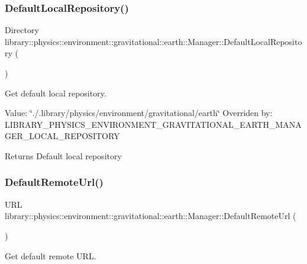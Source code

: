 \subsubsection{\texorpdfstring{Default\+Local\+Repository()}{DefaultLocalRepository()}}
{\footnotesize\ttfamily Directory library\+::physics\+::environment\+::gravitational\+::earth\+::\+Manager\+::\+Default\+Local\+Repository (\begin{DoxyParamCaption}{ }\end{DoxyParamCaption})\hspace{0.3cm}{\ttfamily [static]}}



Get default local repository. 

Value\+: \char`\"{}./.\+library/physics/environment/gravitational/earth\char`\"{} Overriden by\+: L\+I\+B\+R\+A\+R\+Y\+\_\+\+P\+H\+Y\+S\+I\+C\+S\+\_\+\+E\+N\+V\+I\+R\+O\+N\+M\+E\+N\+T\+\_\+\+G\+R\+A\+V\+I\+T\+A\+T\+I\+O\+N\+A\+L\+\_\+\+E\+A\+R\+T\+H\+\_\+\+M\+A\+N\+A\+G\+E\+R\+\_\+\+L\+O\+C\+A\+L\+\_\+\+R\+E\+P\+O\+S\+I\+T\+O\+RY

\begin{DoxyReturn}{Returns}
Default local repository 
\end{DoxyReturn}
\mbox{\label{classlibrary_1_1physics_1_1environment_1_1gravitational_1_1earth_1_1_manager_a3607f55dff9310917a9036ee107be14e}} 
\subsubsection{\texorpdfstring{Default\+Remote\+Url()}{DefaultRemoteUrl()}}
{\footnotesize\ttfamily U\+RL library\+::physics\+::environment\+::gravitational\+::earth\+::\+Manager\+::\+Default\+Remote\+Url (\begin{DoxyParamCaption}{ }\end{DoxyParamCaption})\hspace{0.3cm}{\ttfamily [static]}}



Get default remote U\+RL. 

